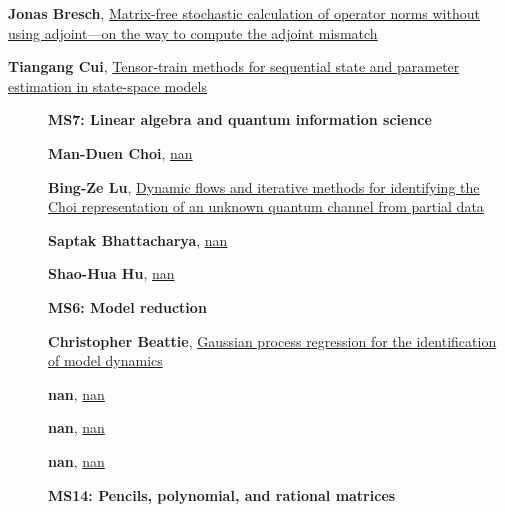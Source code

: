 \documentclass[ILAS2025-program.tex]{subfiles}
\begin{document}
\begin{description}
\begin{description}
{}
        \item[\info{17:00\textrm{--}17:30}] \hypertarget{up0203}{}\textbf{Jonas Bresch}, \hyperlink{down0203}{Matrix-free stochastic calculation of operator norms without using adjoint---on the way to compute the adjoint mismatch}
        \item[\info{17:30\textrm{--}18:00}] \hypertarget{up0204}{}\textbf{Tiangang Cui}, \hyperlink{down0204}{Tensor-train methods for sequential state and parameter estimation in state-space models
}
        \end{description}
    \begin{description}
    \item[] {\color{mstitle}\textbf{MS7: Linear algebra and quantum information science}} 
    \item[] \hypertarget{up0205}{}\textbf{Man-Duen Choi}, \hyperlink{down0205}{nan}
        \item[] \hypertarget{up0206}{}\textbf{Bing-Ze Lu}, \hyperlink{down0206}{Dynamic flows and iterative methods for identifying the Choi representation of an unknown quantum channel from partial data
}
        \item[] \hypertarget{up0207}{}\textbf{Saptak Bhattacharya}, \hyperlink{down0207}{nan}
        \item[] \hypertarget{up0208}{}\textbf{Shao-Hua Hu}, \hyperlink{down0208}{nan}
        \end{description}
    \begin{description}
    \item[] {\color{mstitle}\textbf{MS6: Model reduction}} 
    \item[] \hypertarget{up0209}{}\textbf{Christopher Beattie}, \hyperlink{down0209}{Gaussian process regression for the identification of model dynamics}
        \item[] \hypertarget{up0210}{}\textbf{nan}, \hyperlink{down0210}{nan}
        \item[] \hypertarget{up0211}{}\textbf{nan}, \hyperlink{down0211}{nan}
        \item[] \hypertarget{up0212}{}\textbf{nan}, \hyperlink{down0212}{nan}
        \end{description}
    \begin{description}
    \item[] {\color{mstitle}\textbf{MS14: Pencils, polynomial, and rational matrices}} 

\end{description}
\end{description}
\end{document}
